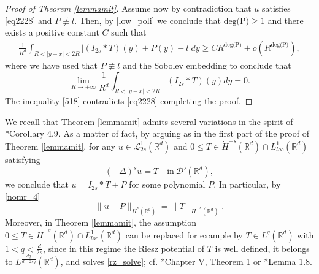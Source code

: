 \documentclass[letterpaper, 11pt,  reqno]{amsart}
\theoremstyle{definition}
\theoremstyle{remark}
\numberwithin{equation}{section}
\newcommand{\R}{{\mathbb R}}
\begin{document}
\begin{proof}[Proof of Theorem \ref{lemmamit}]
Assume now by contradiction that $u$ satisfies \eqref{eq2228} and $P\not\equiv l$. Then, by \eqref{low_poli}  we conclude that $\text{deg(P)}\ge 1$ and there exists a positive constant $C$ such that 
\begin{equation}\label{518}
\begin{split}
  \frac{1}{R^d} \int_{R<|y-x|<2R} |(I_{2s}*T)(y)+P(y)-l|dy
  \ge CR^{\text{deg(P)}}+o(R^{\text{deg(P)}}),
\end{split}
\end{equation}
where we have used that $P\not\equiv l$ and the Sobolev embedding to conclude that
$$\lim_{R\to +\infty}\frac{1}{R^d}\int_{R<|y-x|<2R}(I_{2s}*T)(y)dy=0.$$
The inequality \eqref{518} contradicts \eqref{eq2228} completing the proof. 
\end{proof}
\vspace{1mm}

\remark\label{remarknew} We recall that Theorem \ref{lemmamit} admits several variations in the spirit of \cite{newbook}*{Corollary 4.9}. As a matter of fact, by arguing as in the first part of the proof of Theorem \ref{lemmamit}, for any $u\in \mathscr{L}^{1}_{2s}(\R^d)$ and $0\le  T\in \dot{H}^{-s}(\R^d)\cap L^{1}_{loc}(\R^d)$  satisfying  
\begin{equation}\label{distr5}
	(-\Delta)^{s}u=T\quad \text{in}\ \mathscr{D}'(\R^d), 
\end{equation}
we conclude that 
$u=I_{2s}*T+P $
for some polynomial $P$. In particular, by \eqref{nomr_4}
\begin{equation*}
	\|u-P\|_{\dot{H}^{s}(\R^d)}=\|T\|_{\dot{H}^{-s}(\R^d)}.
\end{equation*}
Moreover, in Theorem \ref{lemmamit}, the assumption $0\le T\in \dot H^{-s}(\R^d)\cap L^{1}_{loc}(\R^d)$ can be replaced for example by $T\in L^{q}(\R^d)$ with $1<q<\frac{d}{2s}$, since in this regime the Riesz potential of $T$ is well defined, it belongs to $L^{\frac{dq}{d-2sq}}(\R^d)$, and solves \eqref{rz_solve}; cf. \cite{Stein}*{Chapter V, Theorem 1} or \cite{mazya}*{Lemma 1.8}.
\vspace{1.5mm}
\end{document}

